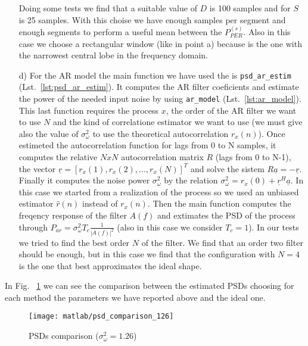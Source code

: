 \documentclass{article}
\newcommand{\inlinecode}[1]{\lstinline[basicstyle=\ttfamily,
    keywordstyle={}]{#1}}
\renewcommand{\vec}[1]{\underline{#1}}
\begin{document}
\begin{itemize}
\newline Doing some tests we find that a suitable value of $D$ is 100 samples and for $S$ is 25 samples. With this choise we have enough samples per segment and enough segments to perform a useful mean between the $P_{PER}^{(s)}$.
\newline Also in this case we choose a rectangular window (like in point a) because is the one with the narrowest central lobe in the frequency domain.
\item[d)]For the AR model the main function we have used the is \inlinecode{psd_ar_estim} (Lst.~\ref{lst:psd_ar_estim}). It computes the AR filter coeficients  and estimate the power of the needed input noise by using \inlinecode{ar_model} (Lst.~\ref{lst:ar_model}). This last function requires the process $x$, the order of the AR filter we want to use $N$ and the kind of correlatione estimator we want to use (we must give also the value of $\sigma_\omega^2$ to use the theoretical autocorrelation $r_x (n)$). Once estimeted the autocorrelation function for lags from 0 to N samples, it computes the relative $NxN$ autocorrelation matrix $R$ (lags from 0 to N-1), the vector $\vec{r} = [r_x (1), r_x (2), ...,r_x (N)]^T$ and solve the sistem $R \vec{a} = - \vec{r}$. Finally it computes the noise power $\sigma_\omega^2$ by the relation $\sigma_\omega^2 = r_x(0) + \vec{r}^H \vec{a}$. In this case we started from a realization of the process so we used an unbiased estimator $\hat{r}(n)$ instead of $r_x (n)$. 
\newline Then the main function computes the freqency response of the filter $A(f)$ and extimates the PSD of the process through $P_{ar} = \sigma_\omega^2 T_c \frac{1}{|A(f)|^2}$ (also in this case we consider $T_c=1$).
\newline In our tests we tried to find the best order $N$ of the filter. We find that an order two filter should be enough, but in this case we find that the configuration with $N = 4$  is the one that best approximates the ideal shape.
\end{itemize}
In Fig. ~\ref{plot:psd_comparison_126} we can see the comparison between the estimated PSDs choosing for each method the parameters we have reported above and the ideal one.
\begin{figure}[htbp]
  \centering
  \texttt{[image: matlab/psd\_comparison\_126]}
  \caption{PSDs comparison ($\sigma_\omega^2 = 1.26$)}
    \label{plot:psd_comparison_126}
\end{figure}
\end{document}
